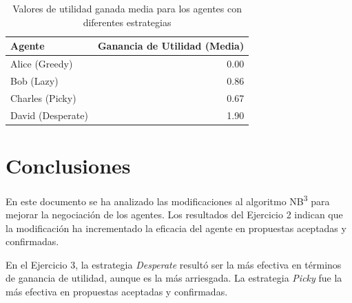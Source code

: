 \documentclass[12pt]{article}
\begin{document}
\begin{table}[h]
    \centering
    \begin{tabular}{|l|r|}
        \hline
        \textbf{Agente}   & \textbf{Ganancia de Utilidad (Media)} \\
        \hline
        Alice (Greedy)    & 0.00                                  \\
        \hline
        Bob (Lazy)        & 0.86                                  \\
        \hline
        Charles (Picky)   & 0.67                                  \\
        \hline
        David (Desperate) & 1.90                                  \\
        \hline
    \end{tabular}
    \caption{Valores de utilidad ganada media para los agentes con diferentes estrategias}
    \label{tab:results3b}
\end{table}

\section*{Conclusiones}

En este documento se ha analizado las modificaciones al algoritmo NB\textsuperscript{3} para mejorar la negociación de los agentes. Los resultados del Ejercicio 2 indican que la modificación ha incrementado la eficacia del agente en propuestas aceptadas y confirmadas.

En el Ejercicio 3, la estrategia \textit{Desperate} resultó ser la más efectiva en términos de ganancia de utilidad, aunque es la más arriesgada. La estrategia \textit{Picky} fue la más efectiva en propuestas aceptadas y confirmadas.






\end{document}
